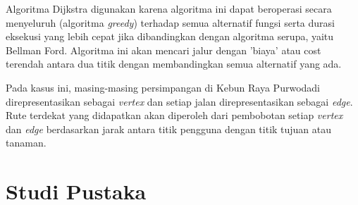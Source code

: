 \documentclass[conference]{IEEEtran}
\begin{document}
Algoritma Dijkstra digunakan karena algoritma ini dapat beroperasi secara menyeluruh (algoritma \textit{greedy}) terhadap semua alternatif fungsi serta durasi eksekusi yang lebih cepat jika dibandingkan dengan algoritma serupa, yaitu Bellman Ford.
Algoritma ini akan mencari jalur dengan 'biaya' atau cost terendah antara dua titik dengan membandingkan semua alternatif yang ada. 

Pada kasus ini, masing-masing persimpangan di Kebun Raya Purwodadi direpresentasikan sebagai \textit{vertex} dan setiap jalan direpresentasikan sebagai \textit{edge}.
Rute terdekat yang didapatkan akan diperoleh dari pembobotan setiap \textit{vertex} dan \textit{edge} berdasarkan jarak antara titik pengguna dengan titik tujuan atau tanaman.

\section{Studi Pustaka}
\end{document}
